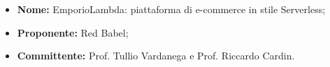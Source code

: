 \begin{itemize}
\item {\bf Nome:} 	EmporioLambda: piattaforma di e-commerce in stile Serverless;
\item {\bf Proponente:} Red Babel;
\item {\bf Committente:} Prof. Tullio Vardanega e Prof. Riccardo Cardin.
\end{itemize}